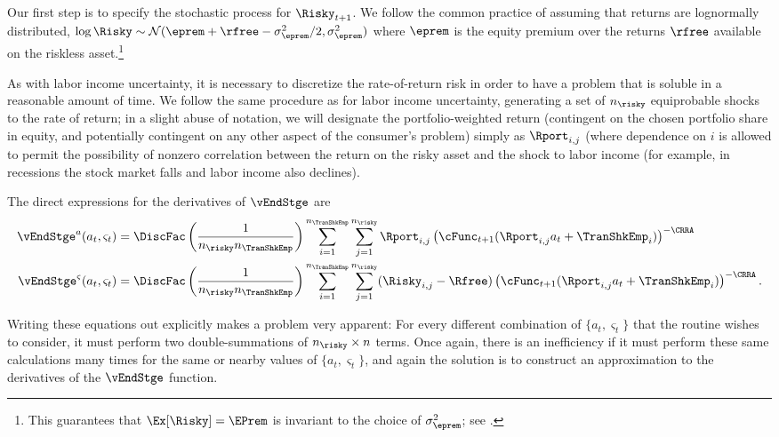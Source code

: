 \documentclass[titlepage, headings=optiontotocandhead]{\econtex}
\begin{document}
Our first step is to specify the stochastic process for $\Risky_{t+1}$.
We follow the common practice of assuming that returns are
lognormally distributed, $\log \Risky \sim
\mathcal{N}(\eprem+\rfree-\sigma^{2}_{\eprem}/2,\sigma^{2}_{\eprem})$ where $\eprem$ is the equity premium
over the returns $\rfree$ available on the riskless asset.\footnote{This guarantees that $\Ex[\Risky] = \EPrem$ is invariant to the choice of $\sigma^{2}_{\eprem}$; see .}

As with labor income uncertainty, it is necessary to discretize the
rate-of-return risk in order to have a problem that is soluble in a
reasonable amount of time.  We follow the same procedure as for labor
income uncertainty, generating a set of $n_{\risky}$ equiprobable shocks to the
rate of return; in a slight abuse of notation, we will designate
the portfolio-weighted return (contingent on the
chosen portfolio share in equity, and potentially contingent on any other
aspect of the consumer's problem) simply as $\Rport_{i,j}$ (where dependence
on $i$ is allowed to permit the possibility of nonzero correlation
between the return on the risky asset and the shock to labor income (for example,
in recessions the stock market falls and labor income also declines).

The direct expressions for the derivatives of $\vEndStge$ are
\begin{equation}\begin{gathered}\begin{aligned}
      \vEndStge^{{a}}({a}_{t},\varsigma_{t})  & = \DiscFac \left(\frac{1}{n_{\risky} n_{\TranShkEmp}}\right)\sum_{i=1}^{n_{\TranShkEmp}}\sum_{j=1}^{n_{\risky} }\Rport_{i,j} \left(\cFunc_{t+1}(\Rport_{i,j}{a}_{t}+\TranShkEmp_{i})\right)^{-\CRRA}
      \\      \vEndStge^{\varsigma}({a}_{t},\varsigma_{t})  & = \DiscFac \left(\frac{1}{n_{\risky} n_{\TranShkEmp}}\right)\sum_{i=1}^{n_{\TranShkEmp}}\sum_{j=1}^{n_{\risky} }(\Risky_{i,j}-\Rfree)\left(\cFunc_{t+1}(\Rport_{i,j}{a}_{t}+\TranShkEmp_{i})\right)^{-\CRRA}.
    \end{aligned}\end{gathered}\end{equation}

Writing these equations out explicitly makes a problem very
apparent: For every different combination of $\{{a}_{t},\varsigma_{t}\}$
that the routine wishes to consider, it must perform two
double-summations of $n_{\risky} \times n$ terms.  Once again, there is an
inefficiency if it must perform these same calculations many times
for the same or nearby values of $\{{a}_{t},\varsigma_{t}\}$, and again
the solution is to construct an approximation to the derivatives of
the $\vEndStge$ function.
\end{document}
